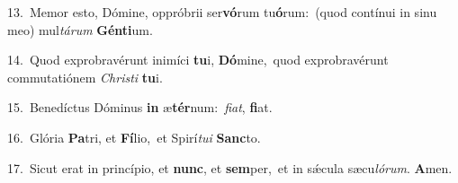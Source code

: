 {\numbfont\textcolor{\numbcolor}{13.}}~Memor esto, Dómine, oppróbrii ser\-\textbf{vó}\-rum tu\-\textbf{ó}\-rum:~\star (quod contínui in sinu meo) mul\-\textit{tá}\-\textit{rum} \textbf{Gén}\-\textbf{ti}um.\par
{\numbfont\textcolor{\numbcolor}{14.}}~Quod exprobravérunt inimíci \textbf{tu}\-i, \textbf{Dó}\-mine,~\star quod exprobravérunt commutatiónem \textit{Chris}\-\textit{ti} \textbf{tu}\-i.\par
{\numbfont\textcolor{\numbcolor}{15.}}~Benedíctus Dóminus \textbf{in} æ\-\textbf{tér}\-num:~\star \textit{fi}\-\textit{at}, \textbf{fi}\-at.\par
{\numbfont\textcolor{\numbcolor}{16.}}~Glória \textbf{Pa}\-tri, et \textbf{Fí}\-lio,~\star et Spirí\-\textit{tu}\-\textit{i} \textbf{Sanc}\-to.\par
{\numbfont\textcolor{\numbcolor}{17.}}~Sicut erat in princípio, et \textbf{nunc}\-, et \textbf{sem}\-per,~\star et in sǽcula sæcu\-\textit{ló}\-\textit{rum}. \textbf{A}\-men.\par

